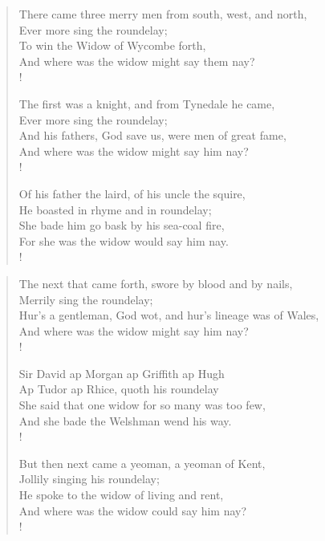 \begin{verse}

There came three merry men from south, west, and north,\\
Ever more sing the roundelay;\\
To win the Widow of Wycombe forth,\\
And where was the widow might say them nay?\\!

The first was a knight, and from Tynedale he came,\\
Ever more sing the roundelay;\\
And his fathers, God save us, were men of great fame,\\
And where was the widow might say him nay?\\!

Of his father the laird, of his uncle the squire,\\
He boasted in rhyme and in roundelay;\\
She bade him go bask by his sea-coal fire,\\
For she was the widow would say him nay.\\!
\end{verse}

\begin{verse}

The next that came forth, swore by blood and by nails,\\
Merrily sing the roundelay;\\
Hur's a gentleman, God wot, and hur's lineage was of Wales,\\
And where was the widow might say him nay?\\!

Sir David ap Morgan ap Griffith ap Hugh\\
Ap Tudor ap Rhice, quoth his roundelay\\
She said that one widow for so many was too few,\\
And she bade the Welshman wend his way.\\!

But then next came a yeoman, a yeoman of Kent,\\
Jollily singing his roundelay;\\
He spoke to the widow of living and rent,\\
And where was the widow could say him nay?\\!
\end{verse}

